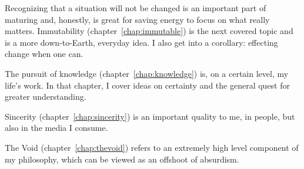 \documentclass[./butidigress.tex]{subfiles}
\begin{document}
Recognizing that a situation will not be changed is an important part of maturing and, honestly, is great for saving energy to focus on what really matters.
Immutability (chapter~\ref{chap:immutable}) is the next covered topic and is a more down-to-Earth, everyday idea.
I also get into a corollary: effecting change when one can.

The pursuit of knowledge (chapter~\ref{chap:knowledge}) is, on a certain level, my life's work.
In that chapter, I cover ideas on certainty and the general quest for greater understanding.

Sincerity (chapter~\ref{chap:sincerity}) is an important quality to me, in people, but also in the media I consume.

The Void (chapter~\ref{chap:thevoid}) refers to an extremely high level component of my philosophy, which can be viewed as an offshoot of absurdism.
\end{document}
